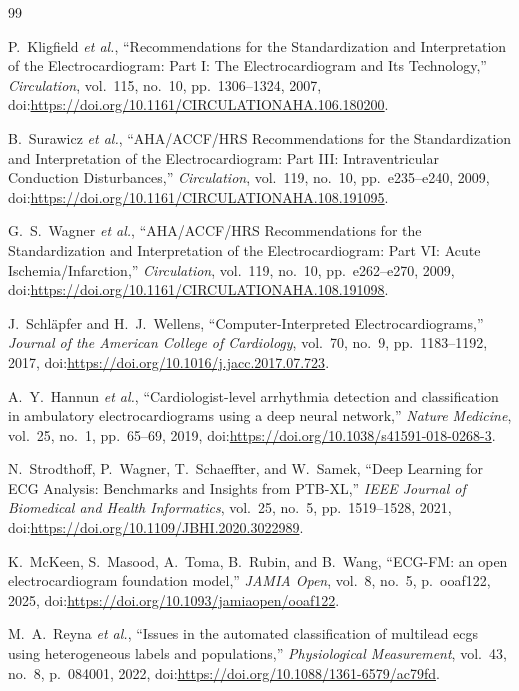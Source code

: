 \begin{thebibliography}{99}

P.~Kligfield \textit{et al.}, ``Recommendations for the Standardization and Interpretation of the Electrocardiogram: Part I: The Electrocardiogram and Its Technology,'' \textit{Circulation}, vol.~115, no.~10, pp.~1306--1324, 2007, doi:\url{https://doi.org/10.1161/CIRCULATIONAHA.106.180200}.

B.~Surawicz \textit{et al.}, ``AHA/ACCF/HRS Recommendations for the Standardization and Interpretation of the Electrocardiogram: Part III: Intraventricular Conduction Disturbances,'' \textit{Circulation}, vol.~119, no.~10, pp.~e235--e240, 2009, doi:\url{https://doi.org/10.1161/CIRCULATIONAHA.108.191095}.

G.~S.~Wagner \textit{et al.}, ``AHA/ACCF/HRS Recommendations for the Standardization and Interpretation of the Electrocardiogram: Part VI: Acute Ischemia/Infarction,'' \textit{Circulation}, vol.~119, no.~10, pp.~e262--e270, 2009, doi:\url{https://doi.org/10.1161/CIRCULATIONAHA.108.191098}.

J.~Schl\"apfer and H.~J.~Wellens, ``Computer-Interpreted Electrocardiograms,'' \textit{Journal of the American College of Cardiology}, vol.~70, no.~9, pp.~1183--1192, 2017, doi:\url{https://doi.org/10.1016/j.jacc.2017.07.723}.

A.~Y.~Hannun \textit{et al.}, ``Cardiologist-level arrhythmia detection and classification in ambulatory electrocardiograms using a deep neural network,'' \textit{Nature Medicine}, vol.~25, no.~1, pp.~65--69, 2019, doi:\url{https://doi.org/10.1038/s41591-018-0268-3}.

N.~Strodthoff, P.~Wagner, T.~Schaeffter, and W.~Samek, ``Deep Learning for ECG Analysis: Benchmarks and Insights from PTB-XL,'' \textit{IEEE Journal of Biomedical and Health Informatics}, vol.~25, no.~5, pp.~1519--1528, 2021, doi:\url{https://doi.org/10.1109/JBHI.2020.3022989}.

K.~McKeen, S.~Masood, A.~Toma, B.~Rubin, and B.~Wang, ``ECG-FM: an open electrocardiogram foundation model,'' \textit{JAMIA Open}, vol.~8, no.~5, p.~ooaf122, 2025, doi:\url{https://doi.org/10.1093/jamiaopen/ooaf122}.

M.~A.~Reyna \textit{et al.}, ``Issues in the automated classification of multilead ecgs using heterogeneous labels and populations,'' \textit{Physiological Measurement}, vol.~43, no.~8, p.~084001, 2022, doi:\url{https://doi.org/10.1088/1361-6579/ac79fd}.


\end{thebibliography}
